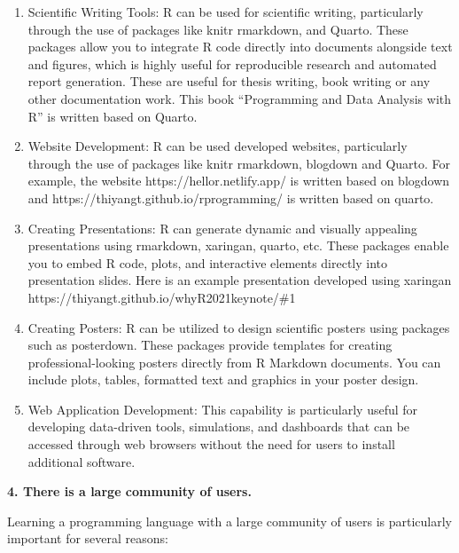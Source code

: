 \documentclass[
  letterpaper,
  DIV=11,
  numbers=noendperiod]{scrreprt}
\begin{document}
\begin{enumerate}
\def\labelenumi{\arabic{enumi}.}
\item
  Scientific Writing Tools: R can be used for scientific writing,
  particularly through the use of packages like knitr rmarkdown, and
  Quarto. These packages allow you to integrate R code directly into
  documents alongside text and figures, which is highly useful for
  reproducible research and automated report generation. These are
  useful for thesis writing, book writing or any other documentation
  work. This book ``Programming and Data Analysis with R'' is written
  based on Quarto.
\item
  Website Development: R can be used developed websites, particularly
  through the use of packages like knitr rmarkdown, blogdown and Quarto.
  For example, the website https://hellor.netlify.app/ is written based
  on blogdown and https://thiyangt.github.io/rprogramming/ is written
  based on quarto.
\item
  Creating Presentations: R can generate dynamic and visually appealing
  presentations using rmarkdown, xaringan, quarto, etc. These packages
  enable you to embed R code, plots, and interactive elements directly
  into presentation slides. Here is an example presentation developed
  using xaringan https://thiyangt.github.io/whyR2021keynote/\#1
\item
  Creating Posters: R can be utilized to design scientific posters using
  packages such as posterdown. These packages provide templates for
  creating professional-looking posters directly from R Markdown
  documents. You can include plots, tables, formatted text and graphics
  in your poster design.
\item
  Web Application Development: This capability is particularly useful
  for developing data-driven tools, simulations, and dashboards that can
  be accessed through web browsers without the need for users to install
  additional software.
\end{enumerate}

\textbf{4. There is a large community of users.}

Learning a programming language with a large community of users is
particularly important for several reasons:
\end{document}
